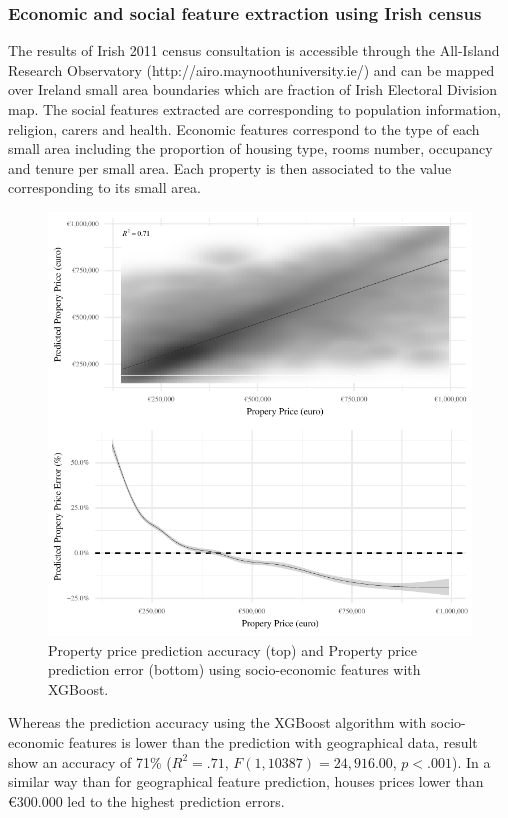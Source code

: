 \documentclass[]{elsarticle} %
\newcommand{\euro}{€}
\begin{document}
\subsubsection{Economic and social feature extraction using Irish
census}\label{economic-and-social-feature-extraction-using-irish-census}

The results of Irish 2011 census consultation is accessible through the
All-Island Research Observatory (http://airo.maynoothuniversity.ie/) and
can be mapped over Ireland small area boundaries which are fraction of
Irish Electoral Division map. The social features extracted are
corresponding to population information, religion, carers and health.
Economic features correspond to the type of each small area including
the proportion of housing type, rooms number, occupancy and tenure per
small area. Each property is then associated to the value corresponding
to its small area.

\begin{figure}[H]
\includegraphics{property_price_paper_new_files/figure-latex/census-features-xgb-1} \caption{Property price prediction accuracy (top) and Property price prediction error (bottom) using socio-economic features with XGBoost.}\label{fig:census-features-xgb}
\end{figure}

Whereas the prediction accuracy using the XGBoost algorithm with
socio-economic features is lower than the prediction with geographical
data, result show an accuracy of 71\% (\(R^2 = .71\),
\(F(1, 10387) = 24,916.00\), \(p < .001\)). In a similar way than for
geographical feature prediction, houses prices lower than \euro{}300.000
led to the highest prediction errors.
\end{document}
